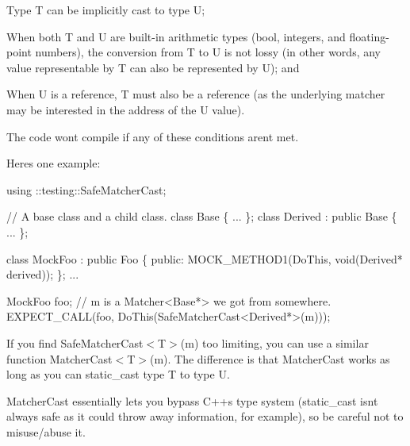 \begin{DoxyEnumerate}
\item Type {\ttfamily T} can be implicitly cast to type {\ttfamily U};
\end{DoxyEnumerate}
\begin{DoxyEnumerate}
\item When both {\ttfamily T} and {\ttfamily U} are built-\/in arithmetic types ({\ttfamily bool}, integers, and floating-\/point numbers), the conversion from {\ttfamily T} to {\ttfamily U} is not lossy (in other words, any value representable by {\ttfamily T} can also be represented by {\ttfamily U}); and
\end{DoxyEnumerate}
\begin{DoxyEnumerate}
\item When {\ttfamily U} is a reference, {\ttfamily T} must also be a reference (as the underlying matcher may be interested in the address of the {\ttfamily U} value).
\end{DoxyEnumerate}

The code won\textquotesingle{}t compile if any of these conditions aren\textquotesingle{}t met.

Here\textquotesingle{}s one example\+:


\begin{DoxyCode}
using ::testing::SafeMatcherCast;

\textcolor{comment}{// A base class and a child class.}
\textcolor{keyword}{class }Base \{ ... \};
\textcolor{keyword}{class }Derived : \textcolor{keyword}{public} Base \{ ... \};

\textcolor{keyword}{class }MockFoo : \textcolor{keyword}{public} Foo \{
 \textcolor{keyword}{public}:
  MOCK\_METHOD1(DoThis, \textcolor{keywordtype}{void}(Derived* derived));
\};
...

  MockFoo foo;
  \textcolor{comment}{// m is a Matcher<Base*> we got from somewhere.}
  EXPECT\_CALL(foo, DoThis(SafeMatcherCast<Derived*>(m)));
\end{DoxyCode}


If you find {\ttfamily Safe\+Matcher\+Cast$<$T$>$(m)} too limiting, you can use a similar function {\ttfamily Matcher\+Cast$<$T$>$(m)}. The difference is that {\ttfamily Matcher\+Cast} works as long as you can {\ttfamily static\+\_\+cast} type {\ttfamily T} to type {\ttfamily U}.

{\ttfamily Matcher\+Cast} essentially lets you bypass C++\textquotesingle{}s type system ({\ttfamily static\+\_\+cast} isn\textquotesingle{}t always safe as it could throw away information, for example), so be careful not to misuse/abuse it.

